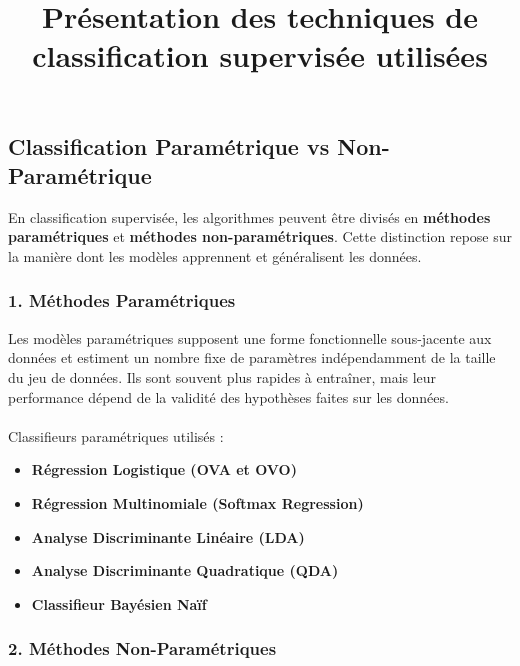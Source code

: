 \documentclass[
  letterpaper,
  DIV=11,
  numbers=noendperiod]{scrartcl}
\title{Présentation des techniques de classification supervisée
utilisées}
\author{}
\date{}
\makeatletter
\let\oldparagraph\paragraph
\renewcommand{\paragraph}{
    \@ifstar
      \xxxParagraphStar
      \xxxParagraphNoStar
  }
\newcommand{\xxxParagraphStar}[1]{\oldparagraph*{#1}\mbox{}}
\newcommand{\xxxParagraphNoStar}[1]{\oldparagraph{#1}\mbox{}}
\providecommand{\tightlist}{%
  \setlength{\itemsep}{0pt}\setlength{\parskip}{0pt}}\usepackage{longtable,booktabs,array}
\makeatother
\begin{document}
\maketitle


\subsection{Classification Paramétrique vs
Non-Paramétrique}\label{classification-paramuxe9trique-vs-non-paramuxe9trique}

En classification supervisée, les algorithmes peuvent être divisés en
\textbf{méthodes paramétriques} et \textbf{méthodes non-paramétriques}.
Cette distinction repose sur la manière dont les modèles apprennent et
généralisent les données.

\subsubsection{1. Méthodes
Paramétriques}\label{muxe9thodes-paramuxe9triques}

Les modèles paramétriques supposent une forme fonctionnelle sous-jacente
aux données et estiment un nombre fixe de paramètres indépendamment de
la taille du jeu de données. Ils sont souvent plus rapides à entraîner,
mais leur performance dépend de la validité des hypothèses faites sur
les données.

\paragraph{Classifieurs paramétriques utilisés
:}\label{classifieurs-paramuxe9triques-utilisuxe9s}

\begin{itemize}
\tightlist
\item
  \textbf{Régression Logistique (OVA et OVO)}
\item
  \textbf{Régression Multinomiale (Softmax Regression)}
\item
  \textbf{Analyse Discriminante Linéaire (LDA)}
\item
  \textbf{Analyse Discriminante Quadratique (QDA)}
\item
  \textbf{Classifieur Bayésien Naïf}
\end{itemize}

\subsubsection{2. Méthodes
Non-Paramétriques}\label{muxe9thodes-non-paramuxe9triques}
\end{document}
